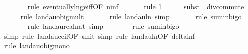 \begin{isabellebody}
\ \ \ \ \ \ \isamarkupfalse%
\ {\isacharparenleft}{\kern0pt}rule\ eventually{\isacharunderscore}{\kern0pt}ln{\isacharunderscore}{\kern0pt}ge{\isacharunderscore}{\kern0pt}iff{\isacharbrackleft}{\kern0pt}OF\ n{\isacharunderscore}{\kern0pt}inf{\isacharbrackright}{\kern0pt}{\isacharparenright}{\kern0pt}\isanewline
\ \ \ \ \ \isamarkupfalse%
\ {\isacharparenleft}{\kern0pt}rule\ l{}{\isacharparenright}{\kern0pt}\isanewline
\ \ \ \ \isamarkupfalse%
\ {\isacharparenleft}{\kern0pt}subst\ {\isacharparenleft}{\kern0pt}{}{\isacharparenright}{\kern0pt}\ div{\isacharunderscore}{\kern0pt}commute{\isacharparenright}{\kern0pt}\isanewline
\ \ \ \ \isamarkupfalse%
\ {\isacharparenleft}{\kern0pt}rule\ landau{\isacharunderscore}{\kern0pt}o{\isachardot}{\kern0pt}big{\isacharunderscore}{\kern0pt}mult{\isacharunderscore}{\kern0pt}{}{\isacharparenright}{\kern0pt}\isanewline
\ \ \ \ \ \isamarkupfalse%
\ {\isacharparenleft}{\kern0pt}rule\ landau{\isacharunderscore}{\kern0pt}ln{\isacharunderscore}{\kern0pt}{}{\isacharcomma}{\kern0pt}\ simp{\isacharparenright}{\kern0pt}\isanewline
\ \ \ \ \ \isamarkupfalse%
\ {\isacharparenleft}{\kern0pt}rule\ sum{\isacharunderscore}{\kern0pt}in{\isacharunderscore}{\kern0pt}bigo{\isacharparenright}{\kern0pt}\isanewline
\ \ \ \ \ \ \isamarkupfalse%
\ {\isacharparenleft}{\kern0pt}rule\ landau{\isacharunderscore}{\kern0pt}real{\isacharunderscore}{\kern0pt}nat{\isacharcomma}{\kern0pt}\ simp{\isacharparenright}{\kern0pt}\isanewline
\ \ \ \ \ \ \isamarkupfalse%
\ {\isacharparenleft}{\kern0pt}rule\ sum{\isacharunderscore}{\kern0pt}in{\isacharunderscore}{\kern0pt}bigo{\isacharparenright}{\kern0pt}\isanewline
\ \ \ \ \ \ \ \isamarkupfalse%
\ {\isacharparenleft}{\kern0pt}simp{\isacharcomma}{\kern0pt}\ rule\ landau{\isacharunderscore}{\kern0pt}ceil{\isacharbrackleft}{\kern0pt}OF\ unit{\isacharunderscore}{\kern0pt}{}{\isacharbrackright}{\kern0pt}{\isacharcomma}{\kern0pt}\ simp{\isacharcomma}{\kern0pt}\ rule\ landau{\isacharunderscore}{\kern0pt}ln{\isacharunderscore}{\kern0pt}{}{\isacharbrackleft}{\kern0pt}OF\ delta{\isacharunderscore}{\kern0pt}inf{\isacharbrackright}{\kern0pt}{\isacharparenright}{\kern0pt}\isanewline
\ \ \ \ \ \ \ \isamarkupfalse%
\ {\isacharparenleft}{\kern0pt}rule\ landau{\isacharunderscore}{\kern0pt}o{\isachardot}{\kern0pt}big{\isacharunderscore}{\kern0pt}mono{\isacharparenright}{\kern0pt}\isanewline

\end{isabellebody}
